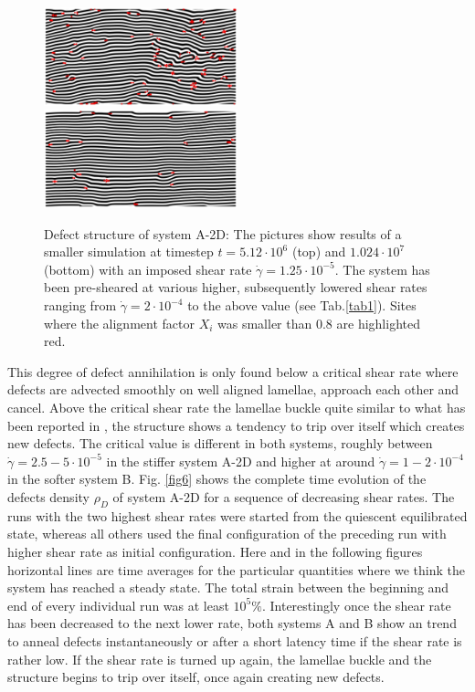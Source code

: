 \documentclass[8.5pt,twoside,twocolumn]{article}
\newcommand{\e}[1]{\cdot10^{#1}}
\begin{document}
\begin{figure}[htp!]
\centering
\includegraphics[angle=0,width=0.5\textwidth]{phi_defects_run774_5120.jpg}
\includegraphics[angle=0,width=0.5\textwidth]{phi_defects_run774_10240.jpg}
\caption{Defect structure of system A-2D: The pictures show results of a smaller simulation at timestep $t=5.12\e{6}$ (top) and $1.024\e{7}$ (bottom) with an imposed shear rate $\dot{\gamma}=1.25\cdot10^{-5}$. The system has been pre-sheared at various higher, subsequently lowered shear rates ranging from $\dot{\gamma}=2\e{-4}$ to the above value (see Tab.\ref{tab1}). Sites where the alignment factor $X_i$ was smaller than $0.8$ are highlighted red.}
\label{fig5}
\end{figure}

This degree of defect annihilation is only found below a critical shear rate where defects are advected smoothly on well aligned lamellae, approach each other and cancel.
Above the critical shear rate the lamellae buckle quite similar to what has been reported in \cite{Gonnella98}, the structure shows a tendency to trip over itself which creates new defects.
The critical value is different in both systems, roughly between $\dot{\gamma}=2.5-5\e{-5}$ in the stiffer system A-2D and higher at around $\dot{\gamma}=1-2\e{-4}$ in the softer system B.
Fig. \ref{fig6} shows the  complete time evolution of the defects density $\rho_D$ of system A-2D for a sequence of decreasing shear rates.
The runs with the two highest shear rates were started from the quiescent equilibrated state, whereas all others used the final configuration of the preceding run with higher shear rate as initial configuration.
Here and in the following figures horizontal lines are time averages for the particular quantities where we think the system has reached a steady state. 
The total strain between the beginning and end of every individual run was at least $10^{5}\%$.
Interestingly once the shear rate has been decreased to the next lower rate, both systems A and B show an trend to anneal defects instantaneously or after a short latency time if the shear rate is rather low.
If the shear rate is turned up again, the lamellae buckle and the structure begins to trip over itself, once again creating new defects.
\end{document}
